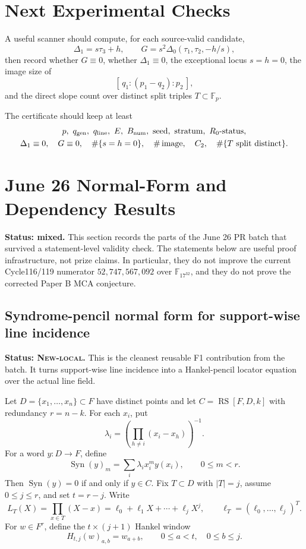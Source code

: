 \documentclass[11pt]{article}
\newcommand{\F}{\mathbb F}
\newcommand{\RS}{\operatorname{RS}}
\newcommand{\Bnum}{B_{\rm num}}
\newcommand{\Deltaone}{\Delta_1}
\newcommand{\Deltazero}{\Delta_0}
\newcommand{\tauone}{\tau_1}
\newcommand{\tautwo}{\tau_2}
\newcommand{\tauthree}{\tau_3}
\newcommand{\Ctwo}{C_2}
\newcommand{\qline}{q_{\rm line}}
\newcommand{\qgen}{q_{\rm gen}}
\begin{document}
\section{Next Experimental Checks}
\label{sec:scanner}

A useful scanner should compute, for each source-valid candidate,
\[
  \Deltaone=s\tauthree+h,
  \qquad
  G=s^2\Deltazero(\tauone,\tautwo,-h/s),
\]
then record whether \(G\equiv0\), whether \(\Deltaone\equiv0\), the exceptional
locus \(s=h=0\), the image size of
\[
  [\,q_1:(p_1-q_2):p_2\,],
\]
and the direct slope count over distinct split triples \(T\subset\F_p\).

The certificate should keep at least
\[
\begin{gathered}
  p,\ \qgen,\ \qline,\ E,\ \Bnum,\ \text{seed},\ \text{stratum},\
  R_0\text{-status},\\
  \Deltaone\equiv0,
  \quad G\equiv0,
  \quad \#\{s=h=0\},
  \quad \#\operatorname{image},
  \quad \Ctwo,
  \quad \#\{T\text{ split distinct}\}.
\end{gathered}
\]

\section{June 26 Normal-Form and Dependency Results}
\label{sec:june26}

\textbf{Status: mixed.}
This section records the parts of the June 26 PR batch that survived a
statement-level validity check.  The statements below are useful proof
infrastructure, not prize claims.  In particular, they do not improve the
current Cycle116/119 numerator \(52{,}747{,}567{,}092\) over
\(\F_{17^{32}}\), and they do not prove the corrected Paper B MCA conjecture.

\subsection{Syndrome-pencil normal form for support-wise line incidence}

\textbf{Status: \textsc{New-local}.}
This is the cleanest reusable F1 contribution from the batch.  It turns
support-wise line incidence into a Hankel-pencil locator equation over the
actual line field.

Let \(D=\{x_1,\ldots,x_n\}\subset F\) have distinct points and let
\(C=\RS[F,D,k]\) with redundancy \(r=n-k\).  For each \(x_i\), put
\[
  \lambda_i=\left(\prod_{h\ne i}(x_i-x_h)\right)^{-1}.
\]
For a word \(y:D\to F\), define
\[
  \operatorname{Syn}(y)_m
  =\sum_i \lambda_i x_i^m y(x_i),
  \qquad 0\le m<r.
\]
Then \(\operatorname{Syn}(y)=0\) if and only if \(y\in C\).  Fix
\(T\subset D\) with \(|T|=j\), assume \(0\le j\le r\), and set \(t=r-j\).
Write
\[
  L_T(X)=\prod_{x\in T}(X-x)=\ell_0+\ell_1X+\cdots+\ell_jX^j,
  \qquad
  \boldsymbol\ell_T=(\ell_0,\ldots,\ell_j)^T .
\]
For \(w\in F^r\), define the \(t\times(j+1)\) Hankel window
\[
  H_{t,j}(w)_{a,b}=w_{a+b},
  \qquad 0\le a<t,\quad 0\le b\le j.
\]
\end{document}
